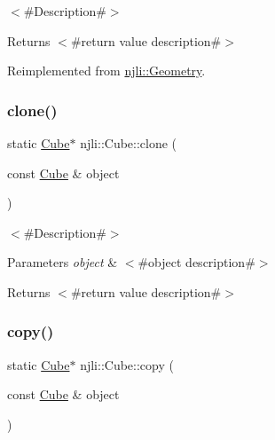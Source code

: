 $<$\#\+Description\#$>$

\begin{DoxyReturn}{Returns}
$<$\#return value description\#$>$ 
\end{DoxyReturn}


Reimplemented from \mbox{\hyperlink{classnjli_1_1_geometry_a8a14d6d068bf303718c1a92886f673b8}{njli\+::\+Geometry}}.

\mbox{\label{classnjli_1_1_cube_a763f1af98f3d6b392f2f759d0704a716}} 
\subsubsection{\texorpdfstring{clone()}{clone()}}
{\footnotesize\ttfamily static \mbox{\hyperlink{classnjli_1_1_cube}{Cube}}$\ast$ njli\+::\+Cube\+::clone (\begin{DoxyParamCaption}\item[{const \mbox{\hyperlink{classnjli_1_1_cube}{Cube}} \&}]{object }\end{DoxyParamCaption})\hspace{0.3cm}{\ttfamily [static]}}

$<$\#\+Description\#$>$


\begin{DoxyParams}{Parameters}
{\em object} & $<$\#object description\#$>$\\
\hline
\end{DoxyParams}
\begin{DoxyReturn}{Returns}
$<$\#return value description\#$>$ 
\end{DoxyReturn}
\mbox{\label{classnjli_1_1_cube_a5df2064e5a8248947522ef439b7d0acd}} 
\subsubsection{\texorpdfstring{copy()}{copy()}}
{\footnotesize\ttfamily static \mbox{\hyperlink{classnjli_1_1_cube}{Cube}}$\ast$ njli\+::\+Cube\+::copy (\begin{DoxyParamCaption}\item[{const \mbox{\hyperlink{classnjli_1_1_cube}{Cube}} \&}]{object }\end{DoxyParamCaption})\hspace{0.3cm}{\ttfamily [static]}}

